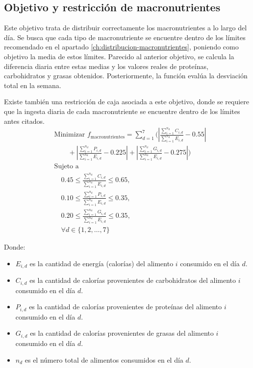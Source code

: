 \subsection{Objetivo y restricción de macronutrientes}
\label{ch:objetivo-restriccion-macronutrientes}

Este objetivo trata de distribuir correctamente los macronutrientes a lo largo del día. Se busca que cada tipo de macronutriente se encuentre dentro de los límites recomendado en el apartado \ref{ch:distribucion-macronutrientes}, poniendo como objetivo la media de estos límites. Parecido al anterior objetivo, se calcula la diferencia diaria entre estas medias y los valores reales de proteínas, carbohidratos y grasas obtenidos. Posteriormente, la función evalúa la desviación total en la semana.

Existe también una restricción de caja asociada a este objetivo, donde se requiere que la ingesta diaria de cada macronutriente se encuentre dentro de los límites antes citados.
\[
\begin{aligned}
& \text{Minimizar } f_{\text{macronutrientes}} = \sum_{d=1}^{7} \Bigg( \left| \frac{\sum_{i=1}^{n_d} C_{i,d}}{\sum_{i=1}^{n_d} E_{i,d}} - 0.55 \right| \\
& \qquad + \left| \frac{\sum_{i=1}^{n_d} P_{i,d}}{\sum_{i=1}^{n_d} E_{i,d}} - 0.225 \right| + \left| \frac{\sum_{i=1}^{n_d} G_{i,d}}{\sum_{i=1}^{n_d} E_{i,d}} - 0.275 \right| \Bigg) \\
& \text{Sujeto a } \\
& \quad 0.45 \leq \frac{\sum_{i=1}^{n_d} C_{i,d}}{\sum_{i=1}^{n_d} E_{i,d}} \leq 0.65, \\
& \quad 0.10 \leq \frac{\sum_{i=1}^{n_d} P_{i,d}}{\sum_{i=1}^{n_d} E_{i,d}} \leq 0.35, \\
& \quad 0.20 \leq \frac{\sum_{i=1}^{n_d} G_{i,d}}{\sum_{i=1}^{n_d} E_{i,d}} \leq 0.35, \\
& \quad \forall d \in \{1, 2, \ldots, 7\}
\end{aligned}
\]
\newpage
\begin{small}
    Donde:
    \begin{itemize}
    \item \( E_{i,d} \) es la cantidad de energía (calorías) del alimento \( i \) consumido en el día \( d \).
    \item \( C_{i,d} \) es la cantidad de calorías provenientes de carbohidratos del alimento \( i \) consumido en el día \( d \).
    \item \( P_{i,d} \) es la cantidad de calorías provenientes de proteínas del alimento \( i \) consumido en el día \( d \).
    \item \( G_{i,d} \) es la cantidad de calorías provenientes de grasas del alimento \( i \) consumido en el día \( d \).
    \item \( n_d \) es el número total de alimentos consumidos en el día \( d \).
    \end{itemize}
\end{small}

